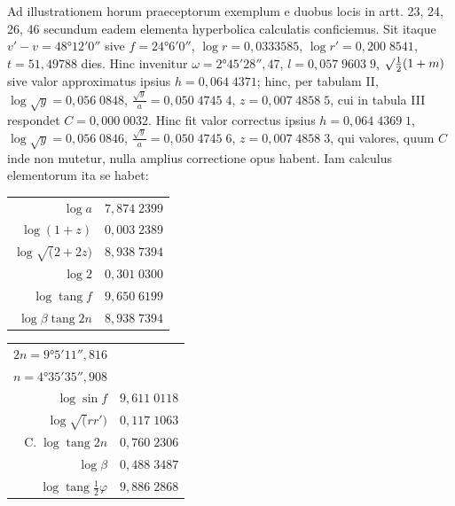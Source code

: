 \documentclass[12pt,a4paper]{article}
\newcommand{\tang}{\mathop{\mathrm{tang}}\nolimits}
\newcommand{\C}{\mathop{\mathrm{C.}}\nolimits}
\begin{document}
\section{}

Ad illustrationem horum praeceptorum exemplum e duobus locis in artt.
23, 24, 26, 46 secundum eadem elementa hyperbolica calculatis conficiemus.
Sit itaque $v' - v = 48°12'0''$ sive $f = 24°6'0''$, $\log r = 0{,}0333585$, $\log r' =
0{,}200\;8541$, $t = 51{,}49788$ dies. Hinc invenitur $\omega = 2°45'28'',47$, $l = 0{,}057\;9603\;9$,
$\surd\frac{1}{2}(1 + m)$ sive valor approximatus ipsius $h = 0{,}064\;4371$; hinc, per tabulam II,
$\log\surd y = 0{,}056\;0848$, $\frac{\surd y}{a} = 0{,}050\;4745\;4$, $z = 0{,}007\;4858\;5$, cui in tabula III
respondet $C = 0{,}000\;0032$. Hinc fit valor correctus ipsius $h = 0{,}064\;4369\;1$,
$\log\surd y = 0{,}056\;0846$, $\frac{\surd y}{a} = 0{,}050\;4745\;6$, $z = 0{,}007\;4858\;3$, qui valores, quum
$C$ inde non mutetur, nulla amplius correctione opus habent. Iam calculus
elementorum ita se habet:

\begin{center}
\begin{tabular}{@{}r@{\quad}l@{}}
$\log a$ & $7{,}874\;2399$ \\
$\log(1 + z)$ & $0{,}003\;2389$ \\
$\log\surd(2 + 2z)$ & $8{,}938\;7394$ \\
$\log 2$ & $0{,}301\;0300$ \\
$\log\tang f$ & $9{,}650\;6199$ \\ \hline
$\log\beta\tang 2n$ & $8{,}938\;7394$
\end{tabular}
\end{center}

\begin{center}
\begin{tabular}{@{}r@{\quad}l@{}}
$2n = 9°5'11'',816$ & \\
$n = 4°35'35'',908$ & \\
$\log\sin f$ & $9{,}611\;0118$ \\
$\log\surd(rr')$ & $0{,}117\;1063$ \\
$\C\log\tang 2n$ & $0{,}760\;2306$ \\ \hline
$\log\beta$ & $0{,}488\;3487$ \\
$\log\tang\tfrac{1}{2}\varphi$ & $9{,}886\;2868$
\end{tabular}
\end{center}
\end{document}
